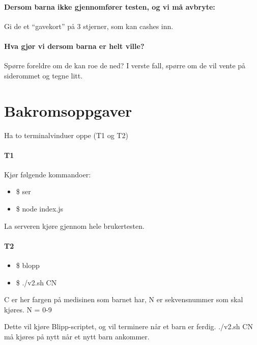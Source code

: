 \paragraph{Dersom barna ikke gjennomf\o rer testen, og vi m\r{a}  avbryte:}
Gi de et ``gavekort'' p\r{a}  3 stjerner, som kan cashes inn. 

\paragraph{Hva gj\o r vi dersom barna er helt ville?}
Sp\o rre foreldre om de kan roe de ned? I verste fall, sp\o rre om de vil vente p\r{a}  siderommet og tegne litt.

\section{Bakromsoppgaver}
Ha to terminalvinduer oppe (T1 og T2)

\paragraph{T1}
Kj\o r f\o lgende kommandoer:
\begin{itemize}
  \item \$ ser
  \item \$ node index.js  
\end{itemize}
La serveren kj\o re gjennom hele brukertesten.
\paragraph{T2}
\begin{itemize}
  \item \$ blopp
  \item \$ ./v2.sh CN  
\end{itemize}
C er her fargen p\r{a} medisinen som barnet har, N er sekvensnummer som skal kj\o res. N = {0-9}

Dette vil kj\o re Blipp-scriptet, og vil terminere n\r{a}r et barn er ferdig. ./v2.sh CN m\r{a} kj\o res p\r{a} nytt n\r{a}r et nytt barn ankommer. 

  
